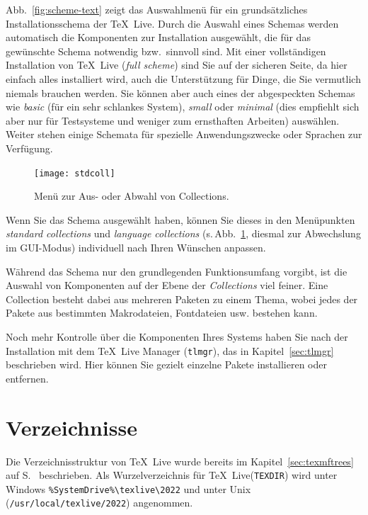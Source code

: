 \documentclass[12pt,ngerman,a4paper,fullparskip]{scrreprt}
\newcommand{\TL}{\TeX\ Live\xspace}
\newcommand{\prog}[1]{\texttt{#1}}
\newcommand{\dirname}[1]{\texttt{#1}}
\begin{document}
\noindent Abb.~\ref{fig:scheme-text} zeigt das Auswahlmenü für ein grundsätzliches Installationsschema der
\TL. Durch die Auswahl eines Schemas werden automatisch die Komponenten zur Installation ausgewählt, die
für das gewünschte Schema notwendig bzw.\ sinnvoll sind. Mit einer vollständigen Installation von \TL
(\emph{full scheme}) sind Sie auf der sicheren Seite, da hier einfach alles installiert wird, auch die Unterstützung für Dinge, die Sie vermutlich niemals brauchen werden. Sie können aber auch eines der abgespeckten Schemas wie \emph{basic} (für ein sehr schlankes System), \emph{small}
oder \emph{minimal} (dies empfiehlt sich aber nur für Testsysteme und weniger zum ernsthaften Arbeiten)
auswählen. Weiter stehen einige Schemata für spezielle Anwendungszwecke oder Sprachen zur Verfügung.

\begin{figure}[tb]
\begin{center}
\texttt{[image: stdcoll]}
\caption{Menü zur Aus- oder Abwahl von Collections.}\label{fig:collections-gui}
\end{center}
\end{figure}

Wenn Sie das Schema ausgewählt haben, können Sie dieses in den Menüpunkten \emph{standard collections} und
\emph{language collections} (s.\,Abb.~\ref{fig:collections-gui}, diesmal zur Abwechslung im GUI-Modus)
individuell nach Ihren Wünschen anpassen.

Während das Schema nur den grundlegenden Funktionsumfang vorgibt, ist die Auswahl von Komponenten auf der
Ebene der \emph{Collections} viel feiner. Eine Collection besteht dabei aus mehreren Paketen zu einem Thema,
wobei jedes der Pakete aus bestimmten Makrodateien, Fontdateien usw. bestehen kann.

Noch mehr Kontrolle über die Komponenten Ihres Systems haben Sie nach der Installation mit dem \TeX\ Live Manager (\prog{tlmgr}), das in Kapitel~\ref{sec:tlmgr} beschrieben wird. Hier können Sie gezielt einzelne Pakete installieren oder entfernen.

\section{Verzeichnisse}\label{sec:directories}


Die Verzeichnisstruktur von \TL wurde bereits im Kapitel~\ref{sec:texmftrees} auf S.~\pageref{sec:texmftrees}
beschrieben. Als Wurzelverzeichnis für \TL (\dirname{TEXDIR}) wird unter Windows
\verb|%SystemDrive%\texlive\2022| und unter Unix (\dirname{/usr/local/texlive/2022}) angenommen. 
\end{document}
